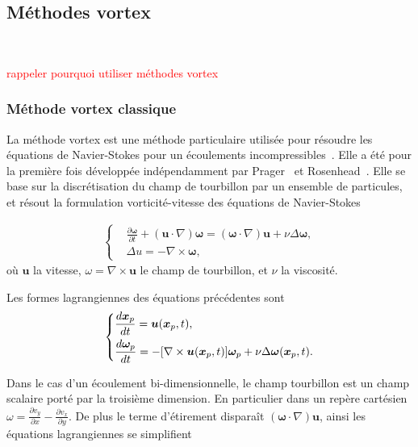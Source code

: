\subsection{Méthodes vortex}~\label{sec:vortex}

\textcolor{red}{rappeler pourquoi utiliser méthodes vortex}
\subsubsection{Méthode vortex classique}

La méthode vortex est une méthode particulaire utilisée pour résoudre les équations de Navier-Stokes pour un écoulements incompressibles~\cite{Cottet_Koumoutsakos_2000}. Elle a été pour la première fois développée indépendamment par Prager~\cite{prager1928druckverteilung} et Rosenhead~\cite{rosenhead1931formation}. Elle se base sur la discrétisation du champ de tourbillon par un ensemble de particules, et résout la formulation vorticité-vitesse des équations de Navier-Stokes


\begin{gather*}
    \left\{\begin{aligned}
         & \frac{\partial \bm \omega}{\partial t} + (\bm{u} \cdot \nabla) \bm \omega  =  (\bm \omega \cdot \nabla) \bm u + \nu \Delta \bm \omega, \\
         & \Delta u   =  -\nabla \times \bm \omega,
    \end{aligned} \right.
\end{gather*}où $\bm{u}$ la vitesse, $\omega= \nabla \times \bm u$ le champ de tourbillon, et $\nu$ la viscosité.

Les formes lagrangiennes des équations précédentes sont
\begin{gather*}
    \left\{\begin{aligned}
         & \frac{d \bm{x}_p}{dt} = \bm u(\bm{x}_p, t),                                                                        \\
         & \frac{d\bm \omega_p}{dt} = - [\nabla \times \bm u (\bm{x}_p, t)]\bm \omega_p + \nu \Delta \bm \omega(\bm{x}_p, t).
    \end{aligned} \right.
\end{gather*}

Dans le cas d'un écoulement bi-dimensionnelle, le champ tourbillon est un champ scalaire porté par la troisième dimension. En particulier dans un repère cartésien $\omega = \frac{\partial v_y}{\partial x} - \frac{\partial v_x}{\partial y}$. De plus le terme d'étirement disparaît $(\bm \omega \cdot \nabla) \bm u$, ainsi les équations lagrangiennes se simplifient


